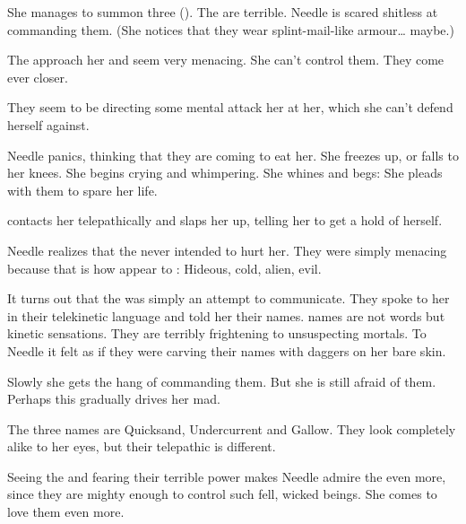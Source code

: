 \begin{comment}
  \section{The Banes arrive}
\end{comment}

She manages to summon three \SitraAchra \quo{\stalkers} (\lesserbanes). 
The \banes{} are terrible. 
Needle is scared shitless at commanding them. 
(She notices that they wear splint-mail-like armour\ldots{} maybe.)

The \banes{} approach her and seem very menacing. 
She can't control them. 
They come ever closer. 

They seem to be directing some mental attack her at her, which she can't defend herself against. 

Needle panics, thinking that they are coming to eat her. 
She freezes up, or falls to her knees. 
She begins crying and whimpering. 
She whines and begs: 
She pleads with them to spare her life. 

\Achsah{} contacts her telepathically and slaps her up, telling her to get a hold of herself. 

Needle realizes that the \banes{} never intended to hurt her. 
They were simply menacing because that is how \banes{} appear to \humans: 
Hideous, cold, alien, evil. 

It turns out that the \pps{\banes}{}  was simply an attempt to communicate. 
They spoke to her in their telekinetic language and told her their names. 
\Bane{} names are not words but kinetic sensations. 
They are terribly frightening to unsuspecting mortals. 
To Needle it felt as if they were carving their names with daggers on her bare skin. 

Slowly she gets the hang of commanding them. 
But she is still afraid of them. 
Perhaps this gradually drives her mad. 

The three \pps{\banes}{} names are Quicksand, Undercurrent and Gallow. 
They look completely alike to her eyes, but their telepathic  is different. 

Seeing the \banes{} and fearing their terrible power makes Needle admire the \resphain{} even more, since they are mighty enough to control such fell, wicked beings. 
She comes to love them even more. 





